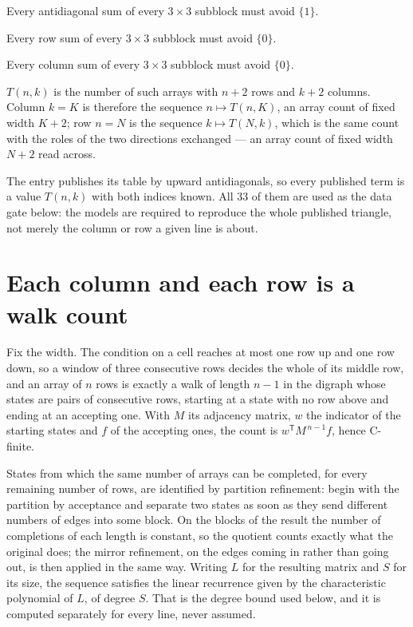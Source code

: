 \documentclass[11pt]{article}
\theoremstyle{definition}
\begin{document}
Every antidiagonal sum of every $3\times3$ subblock must avoid $\{1\}$.

Every row sum of every $3\times3$ subblock must avoid $\{0\}$.

Every column sum of every $3\times3$ subblock must avoid $\{0\}$.

$T(n,k)$ is the number of such arrays with $n + 2$ rows and $k + 2$ columns. Column $k = K$ is therefore the sequence $n \mapsto T(n,K)$, an array count of fixed width $K + 2$; row $n = N$ is the sequence $k \mapsto T(N,k)$, which is the same count with the roles of the two directions exchanged --- an array count of fixed width $N + 2$ read across.

The entry publishes its table by upward antidiagonals, so every published term is a value $T(n,k)$ with both indices known. All 33 of them are used as the data gate below: the models are required to reproduce the whole published triangle, not merely the column or row a given line is about.

\section{Each column and each row is a walk count}

Fix the width. The condition on a cell reaches at most one row up and one row down, so a window of three consecutive rows decides the whole of its middle row, and an array of $n$ rows is exactly a walk of length $n-1$ in the digraph whose states are pairs of consecutive rows, starting at a state with no row above and ending at an accepting one. With $M$ its adjacency matrix, $w$ the indicator of the starting states and $f$ of the accepting ones, the count is $w^{\mathsf T}M^{\,n-1}f$, hence C-finite.

States from which the same number of arrays can be completed, for every remaining number of rows, are identified by partition refinement: begin with the partition by acceptance and separate two states as soon as they send different numbers of edges into some block. On the blocks of the result the number of completions of each length is constant, so the quotient counts exactly what the original does; the mirror refinement, on the edges coming in rather than going out, is then applied in the same way. Writing $L$ for the resulting matrix and $S$ for its size, the sequence satisfies the linear recurrence given by the characteristic polynomial of $L$, of degree $S$. That is the degree bound used below, and it is computed separately for every line, never assumed.
\end{document}
